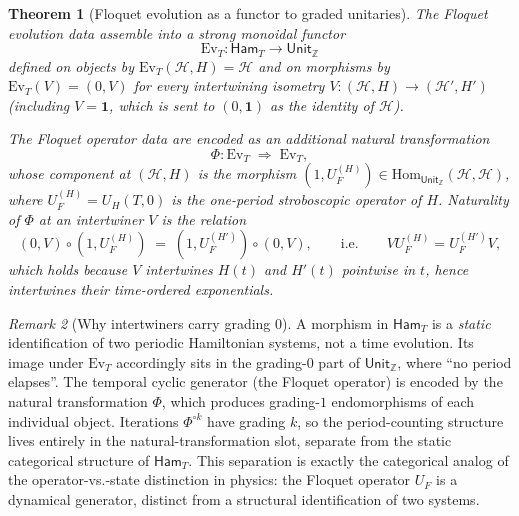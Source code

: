 \documentclass[12pt]{article}
\newtheorem{theorem}{Theorem}[section]
\theoremstyle{definition}
\theoremstyle{remark}
\newtheorem{remark}[theorem]{Remark}
\newcommand{\Hcal}{\mathcal{H}}
\newcommand{\Z}{\mathbb{Z}}
\newcommand{\one}{\mathbf{1}}
\newcommand{\Ham}{\mathsf{Ham}}
\begin{document}
\begin{theorem}[Floquet evolution as a functor to graded unitaries]
\label{thm:floquet-evol}
The Floquet evolution data assemble into a strong monoidal functor
\begin{equation}
\mathrm{Ev}_T\colon \Ham_T \longrightarrow \mathsf{Unit}_{\Z}
\end{equation}
defined on objects by $\mathrm{Ev}_T(\Hcal,H)=\Hcal$ and on morphisms by $\mathrm{Ev}_T(V)=(0,V)$ for every intertwining isometry $V\colon(\Hcal,H)\to(\Hcal',H')$ (including $V=\one$, which is sent to $(0,\one)$ as the identity of $\Hcal$).

The Floquet operator data are encoded as an additional natural transformation
\begin{equation}
\Phi\colon \mathrm{Ev}_T \;\Longrightarrow\; \mathrm{Ev}_T,
\end{equation}
whose component at $(\Hcal,H)$ is the morphism $(1,U_F^{(H)})\in\mathrm{Hom}_{\mathsf{Unit}_{\Z}}(\Hcal,\Hcal)$, where $U_F^{(H)}=U_H(T,0)$ is the one-period stroboscopic operator of $H$. Naturality of $\Phi$ at an intertwiner $V$ is the relation
\begin{equation}
(0,V)\circ(1,U_F^{(H)}) \;=\; (1,U_F^{(H')})\circ(0,V),\qquad\text{i.e.}\qquad VU_F^{(H)}=U_F^{(H')}V,
\end{equation}
which holds because $V$ intertwines $H(t)$ and $H'(t)$ pointwise in $t$, hence intertwines their time-ordered exponentials.
\end{theorem}

\begin{remark}[Why intertwiners carry grading $0$]
\label{rem:ev-grading-zero}
A morphism in $\Ham_T$ is a \emph{static} identification of two periodic Hamiltonian systems, not a time evolution. Its image under $\mathrm{Ev}_T$ accordingly sits in the grading-$0$ part of $\mathsf{Unit}_{\Z}$, where ``no period elapses''. The temporal cyclic generator (the Floquet operator) is encoded by the natural transformation $\Phi$, which produces grading-$1$ endomorphisms of each individual object. Iterations $\Phi^{\circ k}$ have grading $k$, so the period-counting structure lives entirely in the natural-transformation slot, separate from the static categorical structure of $\Ham_T$. This separation is exactly the categorical analog of the operator-vs.-state distinction in physics: the Floquet operator $U_F$ is a dynamical generator, distinct from a structural identification of two systems.
\end{remark}
\end{document}
